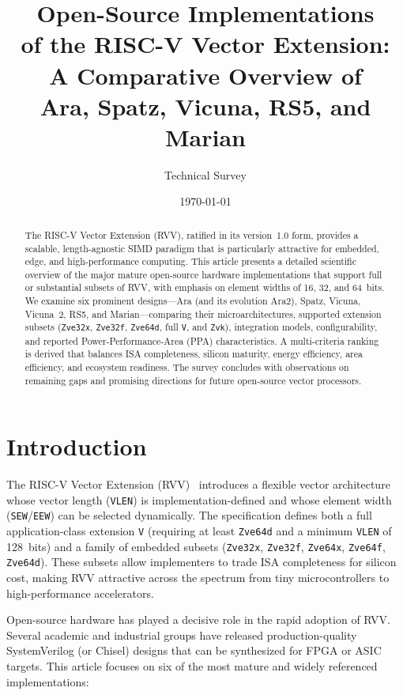 \documentclass[11pt,a4paper]{article}
\title{\textbf{Open-Source Implementations \\of the RISC-V Vector Extension:\\
A Comparative Overview of \\ Ara, Spatz, Vicuna, RS5, and Marian}}
\author{Technical Survey}
\date{\today}
\begin{document}
\maketitle

\begin{abstract}
The RISC-V Vector Extension (RVV), ratified in its version~1.0 form, provides a scalable, length-agnostic SIMD paradigm that is particularly attractive for embedded, edge, and high-performance computing. This article presents a detailed scientific overview of the major mature open-source hardware implementations that support full or substantial subsets of RVV, with emphasis on element widths of 16, 32, and 64~bits. We examine six prominent designs---Ara (and its evolution Ara2), Spatz, Vicuna, Vicuna~2, RS5, and Marian---comparing their microarchitectures, supported extension subsets (\texttt{Zve32x}, \texttt{Zve32f}, \texttt{Zve64d}, full \texttt{V}, and \texttt{Zvk}), integration models, configurability, and reported Power-Performance-Area (PPA) characteristics. A multi-criteria ranking is derived that balances ISA completeness, silicon maturity, energy efficiency, area efficiency, and ecosystem readiness. The survey concludes with observations on remaining gaps and promising directions for future open-source vector processors.
\end{abstract}

\tableofcontents
\newpage

\section{Introduction}

The RISC-V Vector Extension (RVV)~\cite{riscv-v-spec} introduces a flexible vector architecture whose vector length (\texttt{VLEN}) is implementation-defined and whose element width (\texttt{SEW}/\texttt{EEW}) can be selected dynamically. The specification defines both a full application-class extension \texttt{V} (requiring at least \texttt{Zve64d} and a minimum \texttt{VLEN} of 128~bits) and a family of embedded subsets (\texttt{Zve32x}, \texttt{Zve32f}, \texttt{Zve64x}, \texttt{Zve64f}, \texttt{Zve64d}). These subsets allow implementers to trade ISA completeness for silicon cost, making RVV attractive across the spectrum from tiny microcontrollers to high-performance accelerators.

Open-source hardware has played a decisive role in the rapid adoption of RVV. Several academic and industrial groups have released production-quality SystemVerilog (or Chisel) designs that can be synthesized for FPGA or ASIC targets. This article focuses on six of the most mature and widely referenced implementations:
\end{document}
